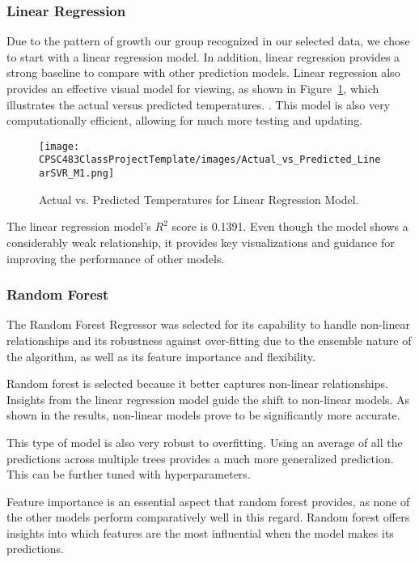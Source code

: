 \documentclass[conference]{IEEEtran}
\begin{document}
\subsubsection{Linear Regression}
Due to the pattern of growth our group recognized in our selected data, we chose to start with a linear regression model. In addition, linear regression provides a strong baseline to compare with other prediction models. Linear regression also provides an effective visual model for viewing, as shown in Figure~\ref{fig:linear_regression_plot}, which illustrates the actual versus predicted temperatures. . This model is also very computationally efficient, allowing for much more testing and updating.

\begin{figure}[htbp]
\centering
\texttt{[image: CPSC483ClassProjectTemplate/images/Actual\_vs\_Predicted\_LinearSVR\_M1.png]}
\caption{Actual vs. Predicted Temperatures for Linear Regression Model.}
\label{fig:linear_regression_plot}
\end{figure}

The linear regression model's \(R^2\) score is 0.1391. Even though the model shows a considerably weak relationship, it provides key visualizations and guidance for improving the performance of other models.

\subsubsection{Random Forest}
The Random Forest Regressor was selected for its capability to handle non-linear relationships and its robustness against over-fitting due to the ensemble nature of the algorithm, as well as its feature importance and flexibility. 

Random forest is selected because it better captures non-linear relationships. Insights from the linear regression model guide the shift to non-linear models. As shown in the results, non-linear models prove to be significantly more accurate.

This type of model is also very robust to overfitting. Using an average of all the predictions across multiple trees provides a much more generalized prediction. This can be further tuned with hyperparameters. 

Feature importance is an essential aspect that random forest provides, as none of the other models perform comparatively well in this regard. Random forest offers insights into which features are the most influential when the model makes its predictions.
\end{document}
